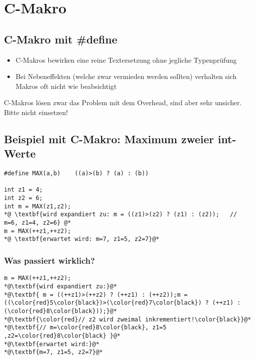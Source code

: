 \section{C-Makro}

\subsection{C-Makro mit {\#define}}
\begin{itemize}
	\item C-Makros bewirken eine reine Textersetzung ohne jegliche Typenprüfung
	\item Bei Nebeneffekten (welche zwar vermieden werden sollten) verhalten sich Makros oft nicht wie beabsichtigt
\end{itemize}
\begin{achtung}
C-Makros lösen zwar das Problem mit dem Overhead, sind aber sehr unsicher. Bitte nicht einsetzen!
\end{achtung}


\subsection{Beispiel mit C-Makro: Maximum zweier int-Werte}
\noindent
\begin{minipage}{0.6\linewidth}
\begin{lstlisting}
#define MAX(a,b)	((a)>(b) ? (a) : (b))

int z1 = 4;
int z2 = 6;
int m = MAX(z1,z2);
*@ \textbf{wird expandiert zu: m = ((z1)>(z2) ? (z1) : (z2));	// m=6, z1=4, z2=6} @*
m = MAX(++z1,++z2);
*@ \textbf{erwartet wird: m=7, z1=5, z2=7}@*
\end{lstlisting}
\end{minipage}

\subsubsection{Was passiert wirklich?}
\noindent
\begin{minipage}{0.6\linewidth}
\begin{lstlisting}
m = MAX(++z1,++z2);
*@\textbf{wird expandiert zu:}@*
*@\textbf{ m = ((++z1)>(++z2) ? (++z1) : (++z2));m = ((\color{red}5\color{black})>(\color{red}7\color{black}) ? (++z1) : (\color{red}8\color{black}));}@*
*@\textbf{\color{red}// z2 wird zweimal inkrementiert!\color{black}}@*
*@\textbf{// m=\color{red}8\color{black}, z1=5 ,z2=\color{red}8\color{black} }@*
*@\textbf{erwartet wird:}@*
*@\textbf{m=7, z1=5, z2=7}@*
\end{lstlisting}
\end{minipage}

